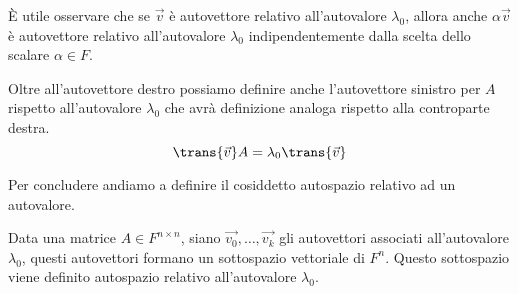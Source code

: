 È utile osservare che se $\vec{v}$ è autovettore relativo all'autovalore $\lambda_0$, allora anche $\alpha\vec{v}$ è autovettore relativo all'autovalore $\lambda_0$ indipendentemente dalla scelta dello scalare $\alpha \in F$.

Oltre all'autovettore destro possiamo definire anche l'autovettore sinistro per $A$ rispetto all'autovalore $\lambda_0$ che avrà definizione analoga rispetto alla controparte destra.
\begin{equation}
    \trans{\vec{v}}A = \lambda_0\trans{\vec{v}}
\end{equation}

Per concludere andiamo a definire il cosiddetto autospazio relativo ad un autovalore.
\begin{definition}
    Data una matrice $A \in F^{n \times n}$, siano $\vec{v_0}, \dots, \vec{v_k}$ gli autovettori associati all'autovalore $\lambda_0$, questi autovettori formano un sottospazio vettoriale di $F^n$. Questo sottospazio viene definito autospazio relativo all'autovalore $\lambda_0$.
\end{definition}